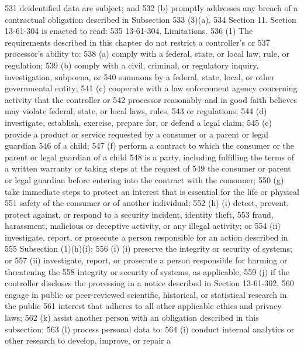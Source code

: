531     deidentified data are subject; and
532          (b) promptly addresses any breach of a contractual obligation described in Subsection
533     (3)(a).
534          Section 11. Section 13-61-304 is enacted to read:
535          13-61-304. Limitations.
536          (1) The requirements described in this chapter do not restrict a controller's or
537     processor's ability to:
538          (a) comply with a federal, state, or local law, rule, or regulation;
539          (b) comply with a civil, criminal, or regulatory inquiry, investigation, subpoena, or
540     summons by a federal, state, local, or other governmental entity;
541          (c) cooperate with a law enforcement agency concerning activity that the controller or
542     processor reasonably and in good faith believes may violate federal, state, or local laws, rules,
543     or regulations;
544          (d) investigate, establish, exercise, prepare for, or defend a legal claim;
545          (e) provide a product or service requested by a consumer or a parent or legal guardian
546     of a child;
547          (f) perform a contract to which the consumer or the parent or legal guardian of a child
548     is a party, including fulfilling the terms of a written warranty or taking steps at the request of
549     the consumer or parent or legal guardian before entering into the contract with the consumer;
550          (g) take immediate steps to protect an interest that is essential for the life or physical
551     safety of the consumer or of another individual;
552          (h) (i) detect, prevent, protect against, or respond to a security incident, identity theft,
553     fraud, harassment, malicious or deceptive activity, or any illegal activity; or
554          (ii) investigate, report, or prosecute a person responsible for an action described in
555     Subsection (1)(h)(i);
556          (i) (i) preserve the integrity or security of systems; or
557          (ii) investigate, report, or prosecute a person responsible for harming or threatening the
558     integrity or security of systems, as applicable;
559          (j) if the controller discloses the processing in a notice described in Section 13-61-302,
560     engage in public or peer-reviewed scientific, historical, or statistical research in the public
561     interest that adheres to all other applicable ethics and privacy laws;
562          (k) assist another person with an obligation described in this subsection;
563          (l) process personal data to:
564          (i) conduct internal analytics or other research to develop, improve, or repair a
